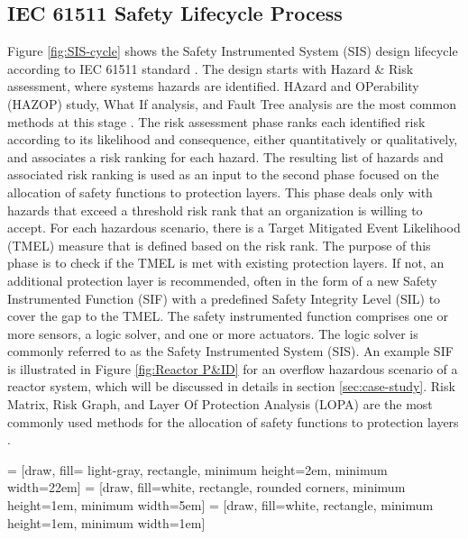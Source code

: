 \documentclass[journal]{IEEEtran}
\begin{document}
\subsection{IEC 61511 Safety Lifecycle Process} \label{sec:safety-lifecycle}
Figure \ref{fig:SIS-cycle} shows the Safety Instrumented System (SIS) design lifecycle according to IEC 61511 standard \cite{IEC61511}. The design starts with Hazard \& Risk assessment, where systems hazards are identified. HAzard and OPerability (HAZOP) study, What If analysis, and Fault Tree analysis are the most common methods at this stage \cite{Dunjo2010}. The risk assessment phase ranks each identified risk according to its likelihood and consequence, either quantitatively or qualitatively, and associates a risk ranking for each hazard. The resulting list of hazards and associated risk ranking is used as an input to the second phase focused on the allocation of safety functions to protection layers. This phase deals only with hazards that exceed a threshold risk rank that an organization is willing to accept. For each hazardous scenario, there is a Target Mitigated Event Likelihood (TMEL) measure that is defined based on the risk rank. The purpose of this phase is to check if the TMEL is met with existing protection layers. If not, an additional protection layer is recommended, often in the form of a new Safety Instrumented Function (SIF) with a predefined Safety Integrity Level (SIL) to cover the gap to the TMEL. The safety instrumented function comprises one or more sensors, a logic solver, and one or more actuators. The logic solver is commonly referred to as the Safety Instrumented System (SIS). An example SIF is illustrated in Figure \ref{fig:Reactor P&ID} for an overflow hazardous scenario of a reactor system, which will be discussed in details in section \ref{sec:case-study}. Risk Matrix, Risk Graph, and Layer Of Protection Analysis (LOPA) are the most commonly used methods for the allocation of safety functions to protection layers \cite{Gruhn2006}.

 = [draw, fill= light-gray, rectangle, minimum height=2em, minimum width=22em]
 = [draw, fill=white, rectangle, rounded corners, minimum height=1em, minimum width=5em]
 = [draw, fill=white, rectangle, minimum height=1em, minimum width=1em]
\end{document}
